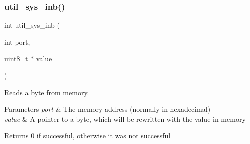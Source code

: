 \subsubsection{\texorpdfstring{util\+\_\+sys\+\_\+inb()}{util\_sys\_inb()}}
{\footnotesize\ttfamily int util\+\_\+sys\+\_\+inb (\begin{DoxyParamCaption}\item[{int}]{port,  }\item[{uint8\+\_\+t $\ast$}]{value }\end{DoxyParamCaption})}



Reads a byte from memory. 


\begin{DoxyParams}{Parameters}
{\em port} & The memory address (normally in hexadecimal) \\
\hline
{\em value} & A pointer to a byte, which will be rewritten with the value in memory\\
\hline
\end{DoxyParams}
\begin{DoxyReturn}{Returns}
0 if successful, otherwise it was not successful 
\end{DoxyReturn}
